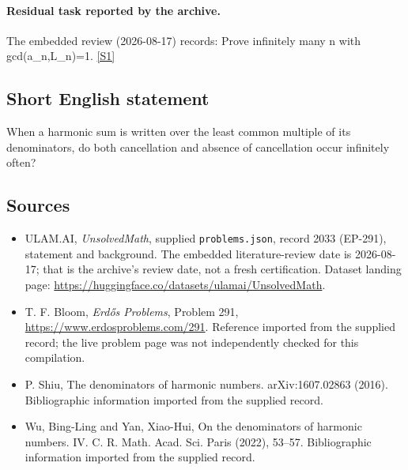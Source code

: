 \documentclass[11pt,a4paper]{article}
\newcommand{\sref}[2]{\hyperlink{source:#1:#2}{[S#2]}}
\begin{document}
\paragraph{Residual task reported by the archive.}

The embedded review (2026-08-17) records: Prove infinitely many n with gcd(a\_n,L\_n)=1. \sref{2033}{1}

\subsection{Short English statement}

When a harmonic sum is written over the least common multiple of its denominators, do both cancellation and absence of cancellation occur infinitely often?

\subsection{Sources}

{\small

\begin{itemize}

\item[\hypertarget{source:2033:1}{S1}] ULAM.AI, \emph{UnsolvedMath}, supplied \texttt{problems.json}, record 2033 (EP-291), statement and background. The embedded literature-review date is 2026-08-17; that is the archive’s review date, not a fresh certification. Dataset landing page: \url{https://huggingface.co/datasets/ulamai/UnsolvedMath}.

\item[\hypertarget{source:2033:2}{S2}] T. F. Bloom, \emph{Erdős Problems}, Problem 291, \url{https://www.erdosproblems.com/291}. Reference imported from the supplied record; the live problem page was not independently checked for this compilation.

\item[\hypertarget{source:2033:3}{S3}] P. Shiu, The denominators of harmonic numbers. arXiv:1607.02863 (2016). Bibliographic information imported from the supplied record.

\item[\hypertarget{source:2033:4}{S4}] Wu, Bing-Ling and Yan, Xiao-Hui, On the denominators of harmonic numbers. {IV}. C. R. Math. Acad. Sci. Paris (2022), 53--57. Bibliographic information imported from the supplied record.

\end{itemize}

}

\label{end:2033}
\end{document}
